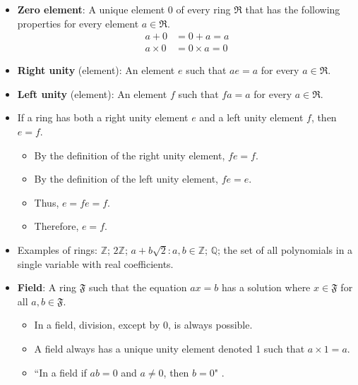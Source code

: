 \documentclass[titlepage]{article}
\numberwithin{figure}{section}
\numberwithin{equation}{section}
\newcommand{\dq}[4][]{``#2"#1 \cite[#4]{#3}.}
\begin{document}
\begin{itemize}
    \item \textbf{Zero element}: A unique element 0 of every ring $\mathfrak{R}$ that has the following properties for every element $a\in\mathfrak{R}$.
    \begin{align*}
        a+0 &= 0+a = a\\
        a\times 0 &= 0\times a = 0
    \end{align*}
    \item \textbf{Right unity} (element): An element $e$ such that $ae=a$ for every $a\in\mathfrak{R}$.
    \item \textbf{Left unity} (element): An element $f$ such that $fa=a$ for every $a\in\mathfrak{R}$.
    \item If a ring has both a right unity element $e$ and a left unity element $f$, then $e=f$.
    \begin{itemize}
        \item By the definition of the right unity element, $fe=f$.
        \item By the definition of the left unity element, $fe=e$.
        \item Thus, $e=fe=f$.
        \item Therefore, $e=f$.
    \end{itemize}
    \item Examples of rings: $\mathbb{Z}$; $2\mathbb{Z}$; $a+b\sqrt{2}:a,b\in\mathbb{Z}$; $\mathbb{Q}$; the set of all polynomials in a single variable with real coefficients.
    \item \textbf{Field}: A ring $\mathfrak{F}$ such that the equation $ax=b$ has a solution where $x\in\mathfrak{F}$ for all $a,b\in\mathfrak{F}$.
    \begin{itemize}
        \item In a field, division, except by 0, is always possible.
        \item A field always has a unique unity element denoted 1 such that $a\times 1=a$.
        \item \dq{In a field if $ab=0$ and $a\neq 0$, then $b=0$}{bib:determinants}{4}
    \end{itemize}
\end{itemize}
\end{document}
